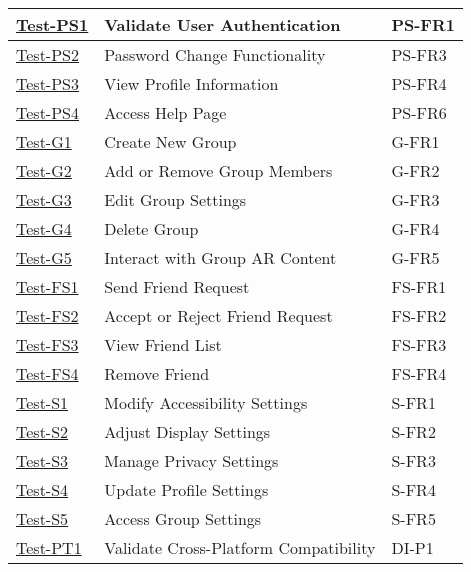 \documentclass[12pt, titlepage]{article}
\begin{document}
\begin{table}[htpb!]
    \centering
    \begin{tabular}{|l|p{8cm}|p{3cm}|}
        \hline
        \hyperref[itm:Test-PS1]{Test-PS1} & Validate User Authentication & PS-FR1 \\
        \hline
        \hyperref[itm:Test-PS2]{Test-PS2} & Password Change Functionality & PS-FR3 \\
        \hline
        \hyperref[itm:Test-PS3]{Test-PS3} & View Profile Information & PS-FR4 \\
        \hline
        \hyperref[itm:Test-PS4]{Test-PS4} & Access Help Page & PS-FR6 \\
        \hline
        \hyperref[itm:Test-G1]{Test-G1} & Create New Group & G-FR1 \\
        \hline
        \hyperref[itm:Test-G2]{Test-G2} & Add or Remove Group Members & G-FR2 \\
        \hline
        \hyperref[itm:Test-G3]{Test-G3} & Edit Group Settings & G-FR3 \\
        \hline
        \hyperref[itm:Test-G4]{Test-G4} & Delete Group & G-FR4 \\
        \hline
        \hyperref[itm:Test-G5]{Test-G5} & Interact with Group AR Content & G-FR5 \\
        \hline
        \hyperref[itm:Test-FS1]{Test-FS1} & Send Friend Request & FS-FR1 \\
        \hline
        \hyperref[itm:Test-FS2]{Test-FS2} & Accept or Reject Friend Request & FS-FR2 \\
        \hline
        \hyperref[itm:Test-FS3]{Test-FS3} & View Friend List & FS-FR3 \\
        \hline
        \hyperref[itm:Test-FS4]{Test-FS4} & Remove Friend & FS-FR4 \\
        \hline
        \hyperref[itm:Test-S1]{Test-S1} & Modify Accessibility Settings & S-FR1 \\
        \hline
        \hyperref[itm:Test-S2]{Test-S2} & Adjust Display Settings & S-FR2 \\
        \hline
        \hyperref[itm:Test-S3]{Test-S3} & Manage Privacy Settings & S-FR3 \\
        \hline
        \hyperref[itm:Test-S4]{Test-S4} & Update Profile Settings & S-FR4 \\
        \hline
        \hyperref[itm:Test-S5]{Test-S5} & Access Group Settings & S-FR5 \\
        \hline
        \hyperref[itm:Test-PT1]{Test-PT1} & Validate Cross-Platform Compatibility & DI-P1 \\

\end{tabular}
\end{table}
\end{document}
